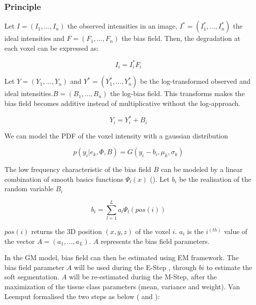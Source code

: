 \subsubsection{Principle}
Let $I=(I_1, ..., I_n)$ the observed intensities in an image, $I^*=(I_1^*, ..., I_n^*)$ the ideal intensities and $F=(F_1, ..., F_n)$ the bias field. Then, the degradation at each voxel can be expressed as:

  \begin{equation*}
  I_i=I_i^*F_i
  \end{equation*}

Let $Y=(Y_1, ..., Y_n)$ and $Y^*=(Y_1^*, ..., Y_n^*)$ be the log-transformed observed and ideal intensities.$B=(B_1, ..., B_n)$ the log-bias field. This transforms makes the bias field becomes additive instead of multiplicative without the log-approach.

  \begin{equation*}
  Y_i=Y_i^* + B_i
  \end{equation*}
  
We can model the PDF of the voxel intensity with a gaussian distribution

 \begin{equation*}
  p(y_i|e_k, \Phi, B) = G(y_i-b_i,\mu_k,\sigma_k)
  \end{equation*}
  
The low frequency characteristic of the bias field $B$ can be modeled by a linear combination of smooth basics functions $\Psi_l(x)$ (\cite{13}). Let $b_i$ be the realisation of the random variable $B_i$ 

  \begin{equation*}
  b_i = \sum_{l=1}^L a_l\Psi_l(pos(i))
  \end{equation*}
  
 $pos(i)$ returns the 3D position $(x,y,z)$ of the voxel $i$. $a_i$ is the $i^{(th)}$ value of the vector $A=(a_1, ..., a_L)$. $A$ represents the bias field parameters.
 \par
In the GM model, bias field can then be estimated using EM framework. The bias field parameter $A$ will be used during the E-Step , through $bi$ to estimate the soft segmentation. $A$ will be re-estimated during the M-Step, after the maximization of the tissue class parameters (mean, variance and weight).
Van Leemput formalised the two steps as below (\cite{8} and \cite{9}):\\

